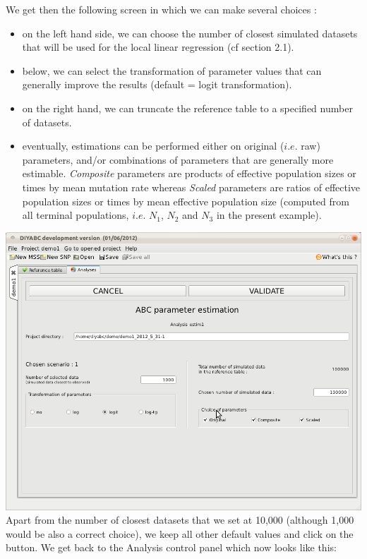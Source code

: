We get then the following screen in which we can make several choices
:
\begin{itemize}
\item on the left hand side, we can choose the number of closest simulated
datasets that will be used for the local linear regression (cf section
2.1).
\item below, we can select the transformation of parameter values that can
generally improve the results (default = logit transformation).
\item on the right hand, we can truncate the reference table to a specified
number of datasets.
\item eventually, estimations can be performed either on original ($i.e.$
raw) parameters, and/or combinations of parameters that are generally
more estimable. \emph{Composite} parameters are products of effective
population sizes or times by mean mutation rate whereas \emph{Scaled}
parameters are ratios of effective population sizes or times by mean
effective population size (computed from all terminal populations,
$i.e.$ $N_{1}$, $N_{2}$ and $N_{3}$ in the present example).
\end{itemize}
\includegraphics[scale=0.35]{gui_pictures/Capture-DIYABC-36} \\


Apart from the number of closest datasets that we set at 10,000 (although
1,000 would be also a correct choice), we keep all other default values
and click on the  button. We get back to
the Analysis control panel which now looks like this:\\


